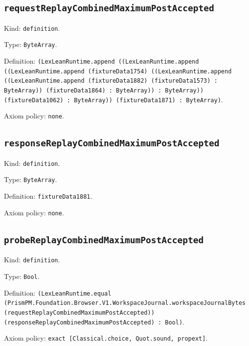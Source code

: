 \documentclass[11pt]{article}
\begin{document}
\subsection*{\texttt{requestReplayCombinedMaximumPostAccepted}}
\noindent Kind: \texttt{definition}.\par
\noindent Type: \texttt{ByteArray}.\par
\noindent Definition: \texttt{(LexLeanRuntime.append ((LexLeanRuntime.append ((LexLeanRuntime.append (fixtureData1754) ((LexLeanRuntime.append ((LexLeanRuntime.append (fixtureData1882) (fixtureData1573) : ByteArray)) (fixtureData1864) : ByteArray)) : ByteArray)) (fixtureData1062) : ByteArray)) (fixtureData1871) : ByteArray)}.\par
\noindent Axiom policy: \texttt{none}.\par
\subsection*{\texttt{responseReplayCombinedMaximumPostAccepted}}
\noindent Kind: \texttt{definition}.\par
\noindent Type: \texttt{ByteArray}.\par
\noindent Definition: \texttt{fixtureData1881}.\par
\noindent Axiom policy: \texttt{none}.\par
\subsection*{\texttt{probeReplayCombinedMaximumPostAccepted}}
\noindent Kind: \texttt{definition}.\par
\noindent Type: \texttt{Bool}.\par
\noindent Definition: \texttt{(LexLeanRuntime.equal (PrismPM.Foundation.Browser.V1.WorkspaceJournal.workspaceJournalBytes (requestReplayCombinedMaximumPostAccepted)) (responseReplayCombinedMaximumPostAccepted) : Bool)}.\par
\noindent Axiom policy: \texttt{exact [Classical.choice, Quot.sound, propext]}.\par
\end{document}
